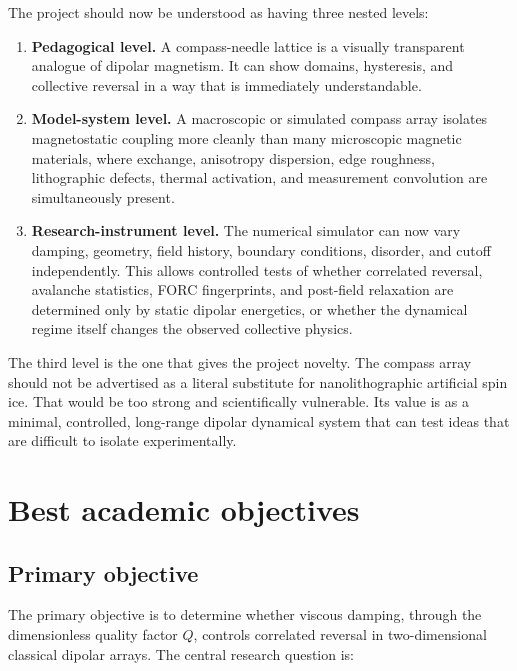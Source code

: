 \documentclass[11pt,a4paper]{article}
\begin{document}
The project should now be understood as having three nested levels:

\begin{enumerate}[leftmargin=*]
\item \textbf{Pedagogical level.} A compass-needle lattice is a visually transparent analogue of dipolar magnetism. It can show domains, hysteresis, and collective reversal in a way that is immediately understandable.
\item \textbf{Model-system level.} A macroscopic or simulated compass array isolates magnetostatic coupling more cleanly than many microscopic magnetic materials, where exchange, anisotropy dispersion, edge roughness, lithographic defects, thermal activation, and measurement convolution are simultaneously present.
\item \textbf{Research-instrument level.} The numerical simulator can now vary damping, geometry, field history, boundary conditions, disorder, and cutoff independently. This allows controlled tests of whether correlated reversal, avalanche statistics, FORC fingerprints, and post-field relaxation are determined only by static dipolar energetics, or whether the dynamical regime itself changes the observed collective physics.
\end{enumerate}

The third level is the one that gives the project novelty. The compass array should not be advertised as a literal substitute for nanolithographic artificial spin ice. That would be too strong and scientifically vulnerable. Its value is as a minimal, controlled, long-range dipolar dynamical system that can test ideas that are difficult to isolate experimentally.

\section{Best academic objectives}
\label{sec:objectives}

\subsection{Primary objective}

The primary objective is to determine whether viscous damping, through the dimensionless quality factor $Q$, controls correlated reversal in two-dimensional classical dipolar arrays. The central research question is:
\end{document}
